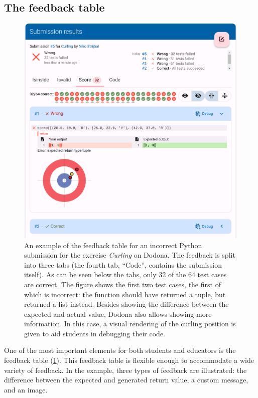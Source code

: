\documentclass[../main]{subfiles}
\begin{document}
\subsection{The feedback table}\label{subsec:the-feedback-table}

\begin{figure}
    \begin{wide}
        \includegraphics[width=\linewidth]{curling}
    \end{wide}
    \caption{
        An example of the feedback table for an incorrect Python submission for the exercise \textit{Curling} on Dodona.
        The feedback is split into three tabs (the fourth tab, ``Code'', contains the submission itself).
        As can be seen below the tabs, only 32 of the 64 test cases are correct.
        The figure shows the first two test cases, the first of which is incorrect: the function should have returned a tuple, but returned a list instead.
        Besides showing the difference between the expected and actual value, Dodona also allows showing more information.
        In this case, a visual rendering of the curling position is given to aid students in debugging their code.
    }
    \label{fig:curling-feedback-table}
\end{figure}

One of the most important elements for both students and educators is the feedback table (\cref{fig:curling-feedback-table}).
This feedback table is flexible enough to accommodate a wide variety of feedback.
In the example, three types of feedback are illustrated: the difference between the expected and generated return value, a custom message, and an image.
\end{document}
